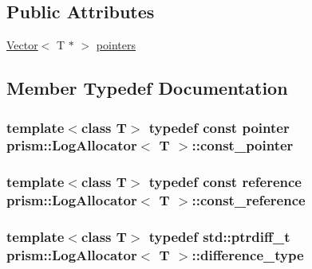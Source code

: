 \subsection*{Public Attributes}
\begin{DoxyCompactItemize}
\item 
\hyperlink{classprism_1_1_vector}{Vector}$<$ T $\ast$ $>$ \hyperlink{classprism_1_1_log_allocator_ab6940c40edbd60c321a99da44db3637d}{pointers}
\end{DoxyCompactItemize}


\subsection{Member Typedef Documentation}
\subsubsection[{\texorpdfstring{const\+\_\+pointer}{const_pointer}}]{\setlength{\rightskip}{0pt plus 5cm}template$<$class T$>$ typedef const {\bf pointer} {\bf prism\+::\+Log\+Allocator}$<$ T $>$\+::{\bf const\+\_\+pointer}}\hypertarget{classprism_1_1_log_allocator_a3533183bc11b2c633d54d7504b515c77}{}\label{classprism_1_1_log_allocator_a3533183bc11b2c633d54d7504b515c77}
\subsubsection[{\texorpdfstring{const\+\_\+reference}{const_reference}}]{\setlength{\rightskip}{0pt plus 5cm}template$<$class T$>$ typedef const {\bf reference} {\bf prism\+::\+Log\+Allocator}$<$ T $>$\+::{\bf const\+\_\+reference}}\hypertarget{classprism_1_1_log_allocator_a8dd85b419a302b7d9cf946726a240a4d}{}\label{classprism_1_1_log_allocator_a8dd85b419a302b7d9cf946726a240a4d}
\subsubsection[{\texorpdfstring{difference\+\_\+type}{difference_type}}]{\setlength{\rightskip}{0pt plus 5cm}template$<$class T$>$ typedef std\+::ptrdiff\+\_\+t {\bf prism\+::\+Log\+Allocator}$<$ T $>$\+::{\bf difference\+\_\+type}}\hypertarget{classprism_1_1_log_allocator_a5cc7253b1e10c86645bd8dbd3ea70858}{}\label{classprism_1_1_log_allocator_a5cc7253b1e10c86645bd8dbd3ea70858}
